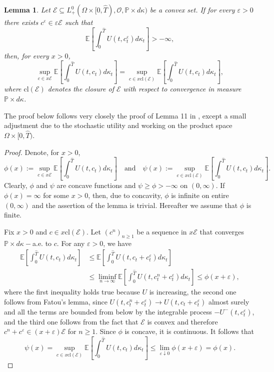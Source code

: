 \documentclass[11pt, oneside]{article}   	%
\theoremstyle{plain}
\newtheorem{lem}[thm]{Lemma}
\theoremstyle{definition}
\theoremstyle{remark}
\begin{document}
\begin{lem}\label{lem:sup-over-set}
Let $\mathcal{E}\subseteq L_+^0(\Omega\times[0,{\hat{T}}),\mathcal{O},\mathbb{P}\times d\kappa)$ be a convex set. If for every $\varepsilon>0$ there exists $c^\varepsilon\in \varepsilon\mathcal{E}$ such that
$$\mathbb{E}\left[\int_0^{\hat{T}} U(t,c^\varepsilon_t)d\kappa_t\right]>-\infty,$$
then, for every $x>0$,
$$\sup_{c\in x\mathcal{E}}\mathbb{E}\left[\int_0^{\hat{T}} U(t,c_t)d\kappa_t\right]=\sup_{c\in x\text{cl}(\mathcal{E})}\mathbb{E}\left[\int_0^{\hat{T}} U(t,c_t)d\kappa_t\right],$$
where $\text{cl}(\mathcal{E})$ denotes the closure of $\mathcal{E}$ with respect to convergence in measure $\mathbb{P}\times d\kappa$.
\end{lem}
The proof below follows very closely the proof of Lemma 11 in \cite{hug-kramkov}, except a small adjustment due to the stochastic utility and working on the product space $\Omega\times[0,{\hat{T}})$.
\begin{proof}
Denote, for $x>0$,
$$\phi(x):=\sup_{c\in x\mathcal{E}}\mathbb{E}\left[\int_0^{\hat{T}} U(t,c_t)d\kappa_t\right]\quad\text{and}\quad \psi(x):=\sup_{c\in x\text{cl}(\mathcal{E})}\mathbb{E}\left[\int_0^{\hat{T}} U(t,c_t)d\kappa_t\right].$$
Clearly, $\phi$ and $\psi$ are concave functions and $\psi\geq\phi>-\infty$ on $(0,\infty)$. If $\phi(x)=\infty$ for some $x>0$, then, due to concavity, $\phi$ is infinite on entire $(0,\infty)$ and the assertion of the lemma is trivial. Hereafter we assume that $\phi$ is finite.

Fix $x>0$ and $c\in x\text{cl}(\mathcal{E})$. Let $(c^n)_{n\geq 1}$ be a sequence in $x\mathcal{E}$ that converges $\mathbb{P}\times d\kappa-$a.e. to $c$. For any $\varepsilon>0$, we have
\begin{align*}
\mathbb{E}\left[\int_0^{\hat{T}} U(t,c_t)d\kappa_t\right]&\leq \mathbb{E}\left[\int_0^{\hat{T}} U(t,c_t+c^\varepsilon_t)d\kappa_t\right]\\
&\leq \liminf_{n\to\infty}\mathbb{E}\left[\int_0^{\hat{T}} U(t,c^n_t+c^\varepsilon_t)d\kappa_t\right]\leq\phi(x+\varepsilon),
\end{align*}
where the first inequality holds true because $U$ is increasing, the second one follows from Fatou's lemma, since $U(t,c^n_t+c^\varepsilon_t)\to U(t,c_t+c^\varepsilon_t)$ almost surely and all the terms are bounded from below by the integrable process $-U^{-}(t, c^\varepsilon_t)$, and the third one follows from the fact that $\mathcal{E}$ is convex and therefore $c^n+c^\varepsilon\in (x+\varepsilon)\mathcal{E}$ for $n\geq 1$. Since $\phi$ is concave, it is continuous. It follows that
$$\psi(x)=\sup_{c\in x\text{cl}(\mathcal{E})}\mathbb{E}\left[\int_0^{\hat{T}} U(t,c_t)d\kappa_t\right]\leq\lim_{\varepsilon\downarrow 0}\phi(x+\varepsilon)=\phi(x).$$
\end{proof}
\end{document}
